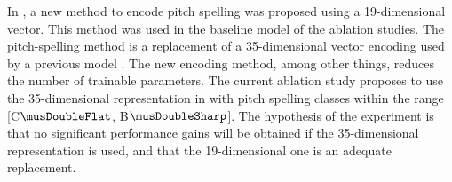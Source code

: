
In , a new method to encode
pitch spelling was proposed using a 19-dimensional vector.
This method was used in the baseline model of the ablation
studies. The pitch-spelling method is a replacement of a
35-dimensional vector encoding used by a previous model
\parencite{micchi2021deep}. The new encoding method, among
other things, reduces the number of trainable parameters.
The current ablation study proposes to use the
35-dimensional representation in \textcite{micchi2021deep}
with pitch spelling classes within the range
[C$\musDoubleFlat$, B$\musDoubleSharp$]. The hypothesis of
the experiment is that no significant performance gains will
be obtained if the 35-dimensional representation is used,
and that the 19-dimensional one is an adequate replacement.

